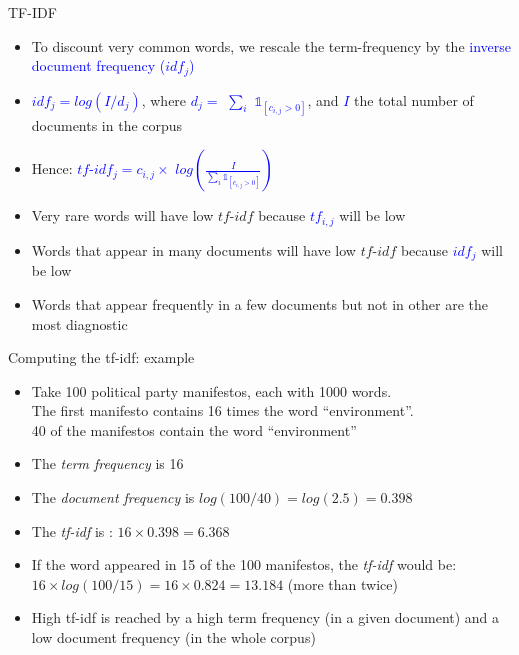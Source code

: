 \documentclass[english]{beamer}
\begin{document}
\begin{frame}{TF-IDF}
\begin{itemize}
\setlength{\itemsep}{1em}
\item To discount very common words, we rescale the term-frequency by the \textcolor{blue}{inverse document frequency ($idf_j$)}
\item \textcolor{blue}{$idf_j = log (I/d_j)$}, where \textcolor{blue}{$d_j=$ $\sum_{i}$
$\mathds{1}_{[c_{i,j}>0]}$}, and \textcolor{blue}{$I$} the total number of documents in the corpus

\item Hence: \textcolor{blue}{$tf$-$idf_{j}= c_{i,j} \times$ $log(\frac{I}{\sum_{i}\mathds{1}_{[c_{i,j}>0]}})$}

\pause

\item Very rare words will have low $tf$-$idf$ because \textcolor{blue}{$tf_{i,j}$} will be low

\item Words that appear in many documents will have low $tf$-$idf$ because  \textcolor{blue}{$idf_j$} will be low

\item Words that appear frequently in a few documents but not in other are the most diagnostic 

\end{itemize}

\end{frame}

\begin{frame}{Computing the tf-idf: example}
\begin{itemize}
\setlength{\itemsep}{1em}
\item Take 100 political party manifestos, each with 1000 words. \\
The first manifesto contains 16 times the word ``environment''. \\
40 of the manifestos contain the word ``environment''
\item The \textit{term frequency} is 16
\item The \textit{document frequency} is $log(100/40)=log(2.5)=0.398$
\item The \textit{tf-idf} is : $16\times 0.398 =6.368$
\item If the word appeared in 15 of the 100 manifestos, the \textit{tf-idf} would be: $16\times log(100/15)=16\times 0.824 = 13.184$ (more than twice)
\item High tf-idf is reached by a high term frequency (in a given document) and a low document frequency (in the whole corpus)
\end{itemize}
\end{frame}
\end{document}
